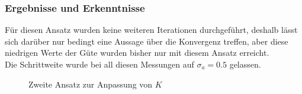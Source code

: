 \documentclass[../Report.tex]{subfiles}
\begin{document}
\subsubsection*{Ergebnisse und Erkenntnisse}
\label{subsubsec:opt.adjusta.kleiner.results}
Für diesen Ansatz wurden keine weiteren Iterationen durchgeführt, deshalb lässt sich darüber nur bedingt eine Aussage über die Konvergenz treffen, aber diese niedrigen Werte der Güte wurden bisher nur mit diesem Ansatz erreicht.\\
Die Schrittweite wurde bei all diesen Messungen auf $\sigma_a = 0.5$ gelassen.
\begin{figure}[H]
\begin{subfigure}{0.5 \textwidth}
	\setlength\figureheight{8cm}
	\setlength\figurewidth{8cm}
    
	\label{fig:opt.kleinerBereich.K}
\end{subfigure}
\begin{subfigure}{0.5 \textwidth}
	\setlength\figureheight{8cm}
	\setlength\figurewidth{8cm}
    
	\label{fig:opt.kleinerBereich.Q}
\end{subfigure}
\label{fig:opt.Kennlinie}
\caption{Zweite Ansatz zur Anpassung von $K$}
\end{figure}
\end{document}
